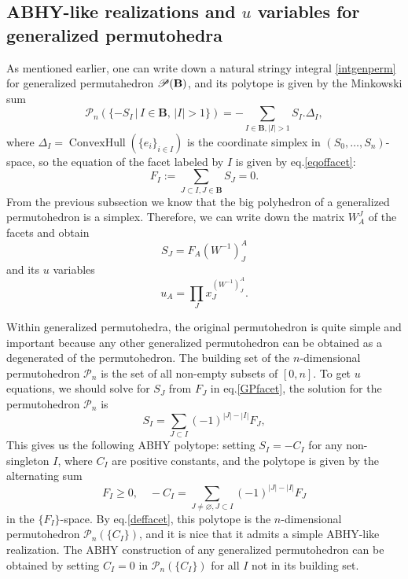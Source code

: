 \documentclass[hidelinks,12pt]{article}
\begin{document}
\subsection{ABHY-like realizations and $u$ variables for generalized permutohedra}

As mentioned earlier, one can write down a natural stringy integral \eqref{intgenperm} for generalized permutahedron $\mathscr{P}(\bf B)$,
and its polytope is given by the Minkowski sum
\[
	\mathscr P_n(\{-S_I\,|\,I\in \mathbf B,\,|I|>1\}) =- \sum_{I\in\mathbf{B},|I|>1}S_I.\Delta_I,
\]
where $\Delta_I=\operatorname{ConvexHull}
(\{e_i\}_{i\in I})$ is the coordinate simplex in $(S_0,\dots,S_n)$-space, so the equation of the facet labeled by $I$ is given by eq.\eqref{eqoffacet}:
\begin{equation}\label{GPfacet}
	F_I:=\sum_{J\subset I,J\in\mathbf{B}}S_J=0.
\end{equation}
From the previous subsection we know that the big polyhedron of a generalized permutohedron is a simplex.
Therefore, we can write down the matrix $W^J_A$ of the facets and obtain  
\[
S_J=F_A(W^{-1})^A_J
\]
and 
its $u$ variables 
\[ u_A=\prod_J x_J^{(W^{-1})^A_J}. \] 

Within generalized permutohedra, the original permutohedron is quite simple and important because any other generalized permutohedron can be obtained as a degenerated of the permutohedron.
The building set of the $n$-dimensional permutohedron $\mathscr P_n$ is 
the set of all non-empty subsets of $[0,n]$. 
To get $u$ equations, we should solve for $S_J$ from $F_J$ in eq.\eqref{GPfacet}, the 
solution for the permutohedron $\mathscr P_n$ is 
\begin{equation}\label{SinF}
	S_I=\sum_{J\subset I} (-1)^{|J|-|I|}F_J,
\end{equation}
This gives us the following ABHY polytope:
setting 
$S_I=-C_I$ for any non-singleton $I$, where $C_I$ are positive 
constants, and the polytope is given by the alternating sum
\begin{equation}\label{ABHY}
	F_I\geq 0,\quad -C_I=\sum_{J\neq \varnothing,J\subset I}(-1)^{|J|-|I|}F_J
\end{equation}
in the $\{F_I\}$-space.
By eq.\eqref{deffacet}, this polytope is the $n$-dimensional 
permutohedron $\mathscr P_n(\{C_I\})$, and it is nice that it admits a simple ABHY-like realization.
The ABHY construction of any generalized permutohedron can be obtained by 
setting $C_I=0$ in $\mathscr P_n(\{C_I\})$ for all $I$ not in its building set.
\end{document}
